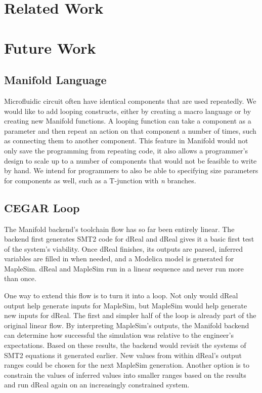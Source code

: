 \section{Related Work}



\section{Future Work}

\subsection{Manifold Language}

Microfluidic circuit often have identical components that are used repeatedly. We would like to add
looping constructs, either by creating a macro language or by creating new Manifold functions. A
looping function can take a component as a parameter and then repeat an action on that component a
number of times, such as connecting them to another component. This feature in Manifold would not
only save the programming from repeating code, it also allows a programmer's design to scale up to
a number of components that would not be feasible to write by hand. We intend for programmers to
also be able to specifying size parameters for components as well, such as a T-junction with
\emph{n} branches.

\subsection{CEGAR Loop}

The Manifold backend's toolchain flow has so far been entirely linear.
The backend first generates SMT2 code for dReal and dReal gives it a basic first test of the system's viability.
Once dReal finishes, its outputs are parsed, inferred variables are filled in when needed, and a Modelica model is generated for MapleSim.
dReal and MapleSim run in a linear sequence and never run more than once.

One way to extend this flow is to turn it into a loop.
Not only would dReal output help generate inputs for MapleSim, but MapleSim would help generate new inputs for dReal.
The first and simpler half of the loop is already part of the original linear flow.
By interpreting MapleSim's outputs, the Manifold backend can determine how successful the simulation was relative to the engineer's expectations.
Based on these results, the backend would revisit the systems of SMT2 equations it generated earlier.
New values from within dReal's output ranges could be chosen for the next MapleSim generation.
Another option is to constrain the values of inferred values into smaller ranges based on the results and run dReal again on an increasingly constrained system.

